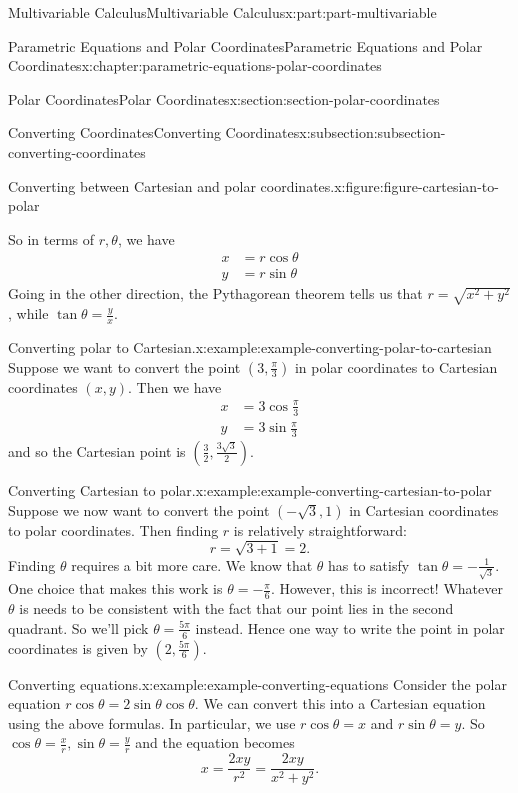 \documentclass[twoside,10pt,]{book}
\numberwithin{equation}{part}
\newcommand{\amp}{&}
\begin{document}
\begin{partptx}{Multivariable Calculus}{}{Multivariable Calculus}{}{}{x:part:part-multivariable}
\begin{chapterptx}{Parametric Equations and Polar Coordinates}{}{Parametric Equations and Polar Coordinates}{}{}{x:chapter:parametric-equations-polar-coordinates}
\begin{sectionptx}{Polar Coordinates}{}{Polar Coordinates}{}{}{x:section:section-polar-coordinates}
\begin{subsectionptx}{Converting Coordinates}{}{Converting Coordinates}{}{}{x:subsection:subsection-converting-coordinates}
\begin{figureptx}{Converting between Cartesian and polar coordinates.}{x:figure:figure-cartesian-to-polar}{}
\begin{image}{0}{1}{0}
{\begin{tikzpicture}
\end{tikzpicture}
}%
\end{image}%
\tcblower
\end{figureptx}%
So in terms of \(r,\theta\), we have%
%
\begin{align*}
x \amp = r\cos\theta \\
y \amp = r\sin\theta 
\end{align*}
Going in the other direction, the Pythagorean theorem tells us that \(r = \sqrt{x^{2}+y^{2}}\), while \(\tan\theta = \frac{y}{x}\).%
\begin{example}{Converting polar to Cartesian.}{x:example:example-converting-polar-to-cartesian}%
Suppose we want to convert the point \((3,\frac{\pi}{3})\) in polar coordinates to Cartesian coordinates \((x,y)\). Then we have%
%
\begin{align*}
x \amp = 3\cos\frac{\pi}{3} \\
y \amp = 3\sin\frac{\pi}{3} 
\end{align*}
and so the Cartesian point is \((\frac{3}{2},\frac{3\sqrt{3}}{2}).\)%
\end{example}
\begin{example}{Converting Cartesian to polar.}{x:example:example-converting-cartesian-to-polar}%
Suppose we now want to convert the point \((-\sqrt{3},1)\) in Cartesian coordinates to polar coordinates. Then finding \(r\) is relatively straightforward:%
%
\begin{equation*}
r = \sqrt{3+1} = 2.
\end{equation*}
Finding \(\theta\) requires a bit more care. We know that \(\theta\) has to satisfy \(\tan\theta = -\frac{1}{\sqrt{3}}\). One choice that makes this work is \(\theta = -\frac{\pi}{6}\). However, this is incorrect! Whatever \(\theta\) is needs to be consistent with the fact that our point lies in the second quadrant. So we'll pick \(\theta = \frac{5\pi}{6}\) instead. Hence one way to write the point in polar coordinates is given by \((2,\frac{5\pi}{6}).\)%
\end{example}
\begin{example}{Converting equations.}{x:example:example-converting-equations}%
Consider the polar equation \(r\cos\theta = 2\sin\theta\cos\theta\). We can convert this into a Cartesian equation using the above formulas. In particular, we use \(r\cos\theta = x\) and \(r\sin\theta = y\). So \(\cos\theta = \frac{x}{r}, \sin\theta = \frac{y}{r}\) and the equation becomes%
%
\begin{equation*}
x = \frac{2xy}{r^{2}} = \frac{2xy}{x^{2}+y^{2}}.

\end{equation*}
\end{example}
\end{subsectionptx}
\end{sectionptx}
\end{chapterptx}
\end{partptx}
\end{document}
